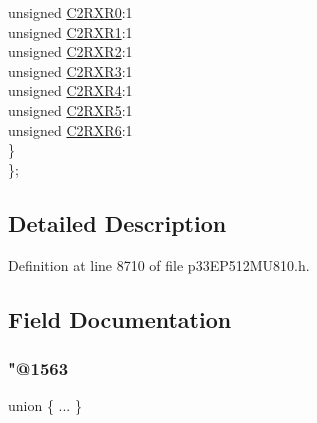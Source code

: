 \begin{DoxyCompactItemize}
\begin{tabbing}
\>\>unsigned \hyperlink{structtag_r_p_i_n_r26_b_i_t_s_a8dd200a1537a8712ac3c962e02917cdb}{C2RXR0}:1\\
\>\>unsigned \hyperlink{structtag_r_p_i_n_r26_b_i_t_s_a99c2c5d2f2a7be182acf0e182308b915}{C2RXR1}:1\\
\>\>unsigned \hyperlink{structtag_r_p_i_n_r26_b_i_t_s_a671e3be79af48a4c210aa33311c27bf9}{C2RXR2}:1\\
\>\>unsigned \hyperlink{structtag_r_p_i_n_r26_b_i_t_s_a35de5f49a6dcb3b797bb0f966fd096d1}{C2RXR3}:1\\
\>\>unsigned \hyperlink{structtag_r_p_i_n_r26_b_i_t_s_a456daba13534939f984b268df2f05f70}{C2RXR4}:1\\
\>\>unsigned \hyperlink{structtag_r_p_i_n_r26_b_i_t_s_ac0b7927762e98a2d8ca9db1d98bc1704}{C2RXR5}:1\\
\>\>unsigned \hyperlink{structtag_r_p_i_n_r26_b_i_t_s_ad20251a7c4faf86101c28640e4abb74f}{C2RXR6}:1\\
\>\} \\
\}; \\

\end{tabbing}\end{DoxyCompactItemize}


\subsection{Detailed Description}


Definition at line 8710 of file p33\+E\+P512\+M\+U810.\+h.



\subsection{Field Documentation}
\mbox{\label{structtag_r_p_i_n_r26_b_i_t_s_a2053c936162d79530785f4f299fde853}} 
\subsubsection{\texorpdfstring{"@1563}{@1563}}
{\footnotesize\ttfamily union \{ ... \} }

\mbox{\label{structtag_r_p_i_n_r26_b_i_t_s_adf71f3d8410c1f1dbbc96680a92c49af}} 
